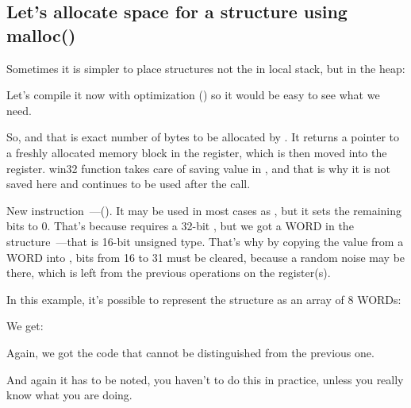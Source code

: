 \subsection{Let's allocate space for a structure using malloc()}
\label{struct_malloc_example}


Sometimes it is simpler to place structures not the in local stack, but in the \gls{heap}:




Let's compile it now with optimization (\Ox) so it would be easy to see what we need.




So,  and that is exact number of bytes to be allocated by .
It returns a pointer to a freshly allocated memory block in the \EAX register,
which is then moved into the \ESI register.
 win32 function takes care of saving value in \ESI,
and that is why it is not saved here and continues to be used after the  call.


New instruction~---\MOVZX ().
It may be used in most cases as \MOVSX, but it sets the remaining bits to 0.
That's because \printf requires a 32-bit \Tint, but we got a WORD in the structure~---that
is 16-bit unsigned type.
That's why by copying the value from a WORD into \Tint{}, bits from 16 to 31 must be cleared, 
because a random noise may be there, which is left from the previous operations on the register(s).


In this example, it's possible to represent the structure as an array of 8 WORDs:



We get:




Again, we got the code that cannot be distinguished from the previous one.

And again it has to be noted, you haven't to do this in practice, unless you really know what you are doing.

